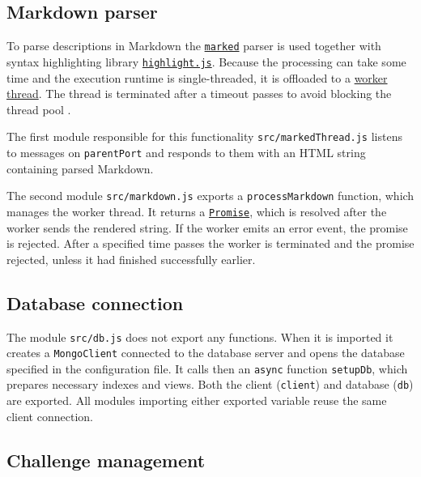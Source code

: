 \subsection{Markdown parser}

To parse descriptions in Markdown the \href{https://marked.js.org/}{\texttt{marked}} parser is used together with syntax highlighting library \href{https://highlightjs.org/}{\texttt{highlight.js}}. Because the processing can take some time and the execution runtime is single-threaded, it is offloaded to a \href{https://nodejs.org/dist/latest-v19.x/docs/api/worker_threads.html}{worker thread}. The thread is terminated after a timeout passes to avoid blocking the thread pool \cite{bib:event-loop-explained,bib:event-loop-blocking}.

The first module responsible for this functionality \texttt{src/markedThread.js} listens to messages on \texttt{parentPort} and responds to them with an HTML string containing parsed Markdown.

The second module \texttt{src/markdown.js} exports a \texttt{processMarkdown} function, which manages the worker thread. It returns a \href{https://tc39.es/ecma262/multipage/control-abstraction-objects.html#sec-promise-objects}{\texttt{Promise}}, which is resolved after the worker sends the rendered string. If the worker emits an error event, the promise is rejected. After a specified time passes the worker is terminated and the promise rejected, unless it had finished successfully earlier.

\subsection{Database connection}

The module \texttt{src/db.js} does not export any functions. When it is imported it creates a \texttt{MongoClient} connected to the database server and opens the database specified in the configuration file. It calls then an \texttt{async} function \texttt{setupDb}, which prepares necessary indexes and views. Both the client (\texttt{client}) and database (\texttt{db}) are exported. All modules importing either exported variable reuse the same client connection.

\subsection{Challenge management}

